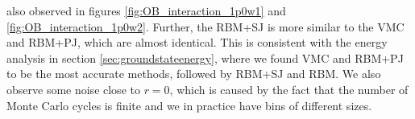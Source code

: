 \noindent
also observed in figures \eqref{fig:OB_interaction_1p0w1} and \eqref{fig:OB_interaction_1p0w2}. Further, the RBM+SJ is more similar to the VMC and RBM+PJ, which are almost identical. This is consistent with the energy analysis in section \ref{sec:groundstateenergy}, where we found VMC and RBM+PJ to be the most accurate methods, followed by RBM+SJ and RBM. We also observe some noise close to $r=0$, which is caused by the fact that the number of Monte Carlo cycles is finite and we in practice have bins of different sizes.

\begin{figure}
	\centering
	\captionsetup[subfigure]{labelformat=empty}
	\hspace{0.1cm}
	\hspace{-0.5cm}
	\\
	

\end{figure}
